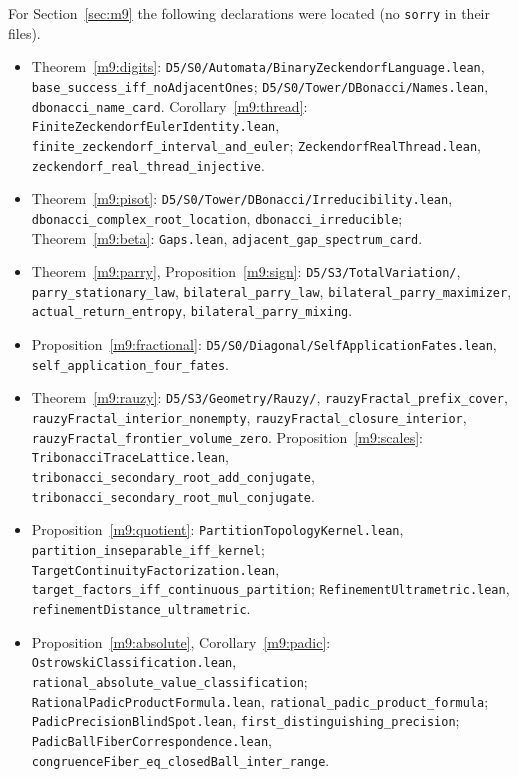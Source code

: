 \documentclass[11pt,reqno]{amsart}
\theoremstyle{definition}
\theoremstyle{remark}
\numberwithin{equation}{section}
\begin{document}
For Section~\ref{sec:m9} the following declarations were located (no \texttt{sorry} in their files).
{\small\raggedright
\begin{itemize}[leftmargin=1.5em]
\item Theorem~\ref{m9:digits}: \texttt{D5/S0/Automata/BinaryZeckendorfLanguage.lean}, \texttt{base\_success\_iff\_noAdjacentOnes};
\texttt{D5/S0/Tower/DBonacci/Names.lean}, \texttt{dbonacci\_name\_card}. Corollary~\ref{m9:thread}:
\texttt{FiniteZeckendorfEulerIdentity.lean}, \texttt{finite\_zeckendorf\_interval\_and\_euler}; \texttt{ZeckendorfRealThread.lean},
\texttt{zeckendorf\_real\_thread\_injective}.
\item Theorem~\ref{m9:pisot}: \texttt{D5/S0/Tower/DBonacci/Irreducibility.lean}, \texttt{dbonacci\_complex\_root\_location},
\texttt{dbonacci\_irreducible}; Theorem~\ref{m9:beta}: \texttt{Gaps.lean}, \texttt{adjacent\_gap\_spectrum\_card}.
\item Theorem~\ref{m9:parry}, Proposition~\ref{m9:sign}: \texttt{D5/S3/TotalVariation/}, \texttt{parry\_stationary\_law},
\texttt{bilateral\_parry\_law}, \texttt{bilateral\_parry\_maximizer}, \texttt{actual\_return\_entropy}, \texttt{bilateral\_parry\_mixing}.
\item Proposition~\ref{m9:fractional}: \texttt{D5/S0/Diagonal/SelfApplicationFates.lean}, \texttt{self\_application\_four\_fates}.
\item Theorem~\ref{m9:rauzy}: \texttt{D5/S3/Geometry/Rauzy/}, \texttt{rauzyFractal\_prefix\_cover}, \texttt{rauzyFractal\_interior\_nonempty},
\texttt{rauzyFractal\_closure\_interior}, \texttt{rauzyFractal\_frontier\_volume\_zero}. Proposition~\ref{m9:scales}:
\texttt{TribonacciTraceLattice.lean}, \texttt{tribonacci\_secondary\_root\_add\_conjugate}, \texttt{tribonacci\_secondary\_root\_mul\_conjugate}.
\item Proposition~\ref{m9:quotient}: \texttt{PartitionTopologyKernel.lean}, \texttt{partition\_inseparable\_iff\_kernel};
\texttt{TargetContinuityFactorization.lean}, \texttt{target\_factors\_iff\_continuous\_partition}; \texttt{RefinementUltrametric.lean},
\texttt{refinementDistance\_ultrametric}.
\item Proposition~\ref{m9:absolute}, Corollary~\ref{m9:padic}: \texttt{OstrowskiClassification.lean}, \texttt{rational\_absolute\_value\_classification};
\texttt{RationalPadicProductFormula.lean}, \texttt{rational\_padic\_product\_formula}; \texttt{PadicPrecisionBlindSpot.lean},
\texttt{first\_distinguishing\_precision}; \texttt{PadicBallFiberCorrespondence.lean}, \texttt{congruenceFiber\_eq\_closedBall\_inter\_range}.

\end{itemize}}
\end{document}
